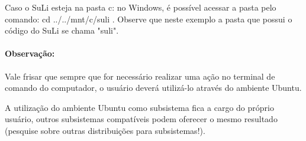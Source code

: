 \documentclass[12pt, a4paper]{article}
\newcommand{\red}{\textcolor{red}}
\begin{document}
Caso o SuLi esteja na pasta c: no Windows, é possível acessar a pasta pelo comando: cd ../../mnt/c/suli . Observe que neste exemplo a pasta que possui o código do SuLi se chama "suli".


\paragraph{Observação:} Vale frisar que sempre que for necessário realizar uma ação no terminal de comando do computador, o usuário deverá utilizá-lo através do ambiente Ubuntu.

A utilização do ambiente Ubuntu como subsistema fica a cargo do próprio usuário, outros subsistemas compatíveis podem oferecer o mesmo resultado (pesquise sobre outras distribuições para subsistemas!).


\newpage


\end{document}
